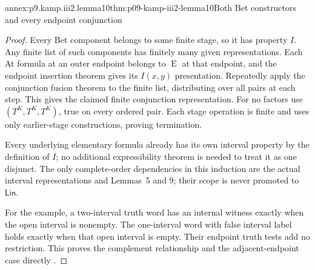 \begin{annexitem}{annex:p9.kamp.iii2.lemma10}{thm:p09-kamp-iii2-lemma10}{Both Bet constructors and every endpoint conjunction}
\begin{proof}
Every Bet component belongs to some finite stage, so it has property
\(I\). Any finite list of such components has finitely many
given representations. Each At formula at an outer endpoint belongs
to \(\operatorname{E}\) at that endpoint, and the endpoint
insertion theorem gives its \(I(x,y)\) presentation. Repeatedly
apply the conjunction fusion theorem to the finite list, distributing
over all pairs at each step. This gives the claimed finite conjunction
representation. For no factors use \((T^K,T^K,T^K)\), true on
every ordered pair. Each stage operation is finite and uses only
earlier-stage constructions, proving termination.

Every underlying elementary formula already has its own interval
property by the definition of \(I\); no additional expressibility
theorem is needed to treat it as one disjunct. The only complete-order
dependencies in this induction are the actual interval representations
and Lemmas~5 and 9; their scope is never promoted to \(\mathsf{Lin}\).

For the example, a two-interval truth word has an internal witness
exactly when the open interval is nonempty. The one-interval word with
false interval label holds exactly when that open interval is empty.
Their endpoint truth tests add no restriction. This proves the
complement relationship and the adjacent-endpoint case directly
\cite[ch.~III, lemma~10, p.~93]{Kamp1968}.
\end{proof}
\end{annexitem}

